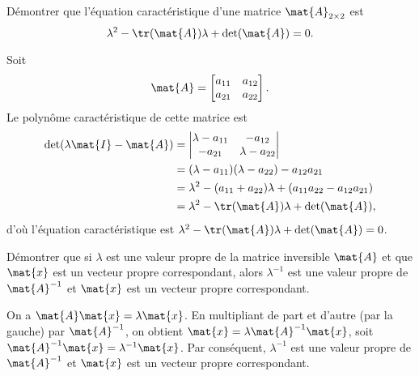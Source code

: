 \begin{exercice}
  Démontrer que l'équation caractéristique d'une matrice
  $\mat{A}_{2 \times 2}$ est
  \begin{displaymath}
    \lambda^2 - \tr(\mat{A}) \lambda + \det(\mat{A}) = 0.
  \end{displaymath}
  \begin{sol}
    Soit
    \begin{displaymath}
      \mat{A} =
      \begin{bmatrix}
        a_{11} & a_{12} \\ a_{21} & a_{22}
      \end{bmatrix}.
    \end{displaymath}
    Le polynôme caractéristique de cette matrice est
    \begin{align*}
      \det(\lambda \mat{I} - \mat{A})
      &=
      \begin{vmatrix}
        \lambda - a_{11} & -a_{12} \\ -a_{21} & \lambda - a_{22}
      \end{vmatrix} \\
      &= (\lambda - a_{11})(\lambda - a_{22}) - a_{12} a_{21} \\
      &= \lambda^2 - (a_{11} + a_{22}) \lambda +
      (a_{11} a_{22} - a_{12} a_{21}) \\
      &= \lambda^2 - \tr(\mat{A}) \lambda + \det(\mat{A}),
    \end{align*}
    d'où l'équation caractéristique est $\lambda^2 - \tr(\mat{A})
    \lambda + \det(\mat{A}) = 0$.
  \end{sol}
\end{exercice}

\begin{exercice}
  \label{ex:valeurspropres:inverse}
  Démontrer que si $\lambda$ est une valeur propre de la matrice
  inversible $\mat{A}$ et que $\mat{x}$ est un vecteur propre
  correspondant, alors $\lambda^{-1}$ est une valeur propre de
  $\mat{A}^{-1}$ et $\mat{x}$ est un vecteur propre correspondant.
  \begin{sol}
    On a $\mat{A} \mat{x} = \lambda \mat{x}$. En multipliant de part
    et d'autre (par la gauche) par $\mat{A}^{-1}$, on obtient $\mat{x}
    = \lambda \mat{A}^{-1} \mat{x}$, soit $\mat{A}^{-1} \mat{x} =
    \lambda^{-1} \mat{x}$. Par conséquent, $\lambda^{-1}$ est une
    valeur propre de $\mat{A}^{-1}$ et $\mat{x}$ est un vecteur propre
    correspondant.
  \end{sol}
\end{exercice}

